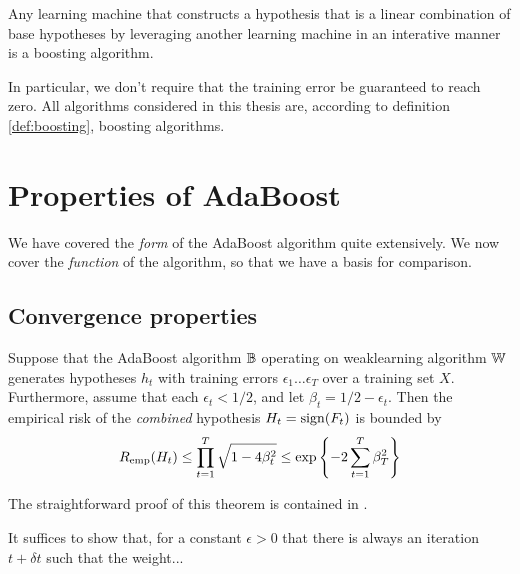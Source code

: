 \begin{definition}
Any learning machine that constructs a hypothesis that is a linear
combination of base hypotheses by leveraging another learning machine
in an interative manner is a boosting algorithm.
\end{definition}

In particular, we don't require that the training error be guaranteed
to reach zero.  All algorithms considered in this thesis are,
according to definition \ref{def:boosting}, boosting algorithms.


\section{Properties of AdaBoost}

We have covered the \emph{form} of the AdaBoost algorithm quite
extensively.  We now cover the \emph{function} of the algorithm, so
that we have a basis for comparison.

\subsection{Convergence properties}

\begin{theorem}
\label{thm:AdaBoost training error convergence}
Suppose that the AdaBoost algorithm $\mathbb{B}$ operating on weaklearning
algorithm $\mathbb{W}$ generates hypotheses $h_t$ with training errors
$\epsilon_1 \ldots \epsilon_T$ over a training set $X$.  Furthermore,
assume that each $\epsilon_t < 1/2$, and let $\beta_t = 1/2 -
\epsilon_t$.  Then the empirical risk of the \emph{combined}
hypothesis $H_t = \mathrm{sign}(F_t)$ is bounded by
%
\begin{equation}
R_{\mathrm{emp}}(H_t) \leq \prod_{t=1}^{T} \sqrt{1 - 4 \beta_t^2} \leq \exp
\left\{ - 2 \sum_{t=1}^T \beta_T^2 \right\}
\end{equation}
\end{theorem}

\proof The straightforward proof of this theorem is contained in
\cite{Freund97}.


\begin{theorem}
\label{thm:increasing classifier weights}
\end{theorem}

\proof It suffices to show that, for a constant $\epsilon > 0$ that
there is always an iteration $t + \delta t$ such that the weight...


